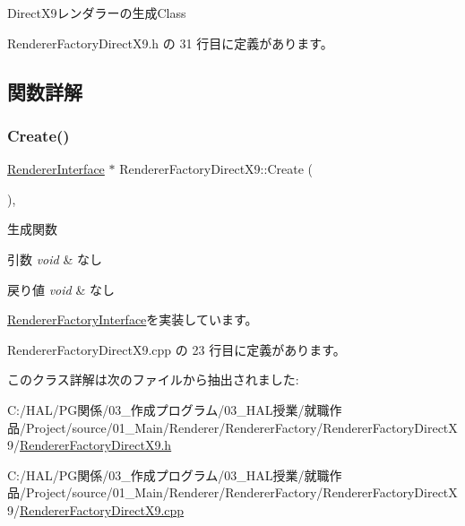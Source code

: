 Direct\+X9レンダラーの生成\+Class 

 Renderer\+Factory\+Direct\+X9.\+h の 31 行目に定義があります。



\subsection{関数詳解}
\mbox{\label{class_renderer_factory_direct_x9_a55541ea707af7ba3c006b0ea11a1fd49}} 
\subsubsection{\texorpdfstring{Create()}{Create()}}
{\footnotesize\ttfamily \mbox{\hyperlink{class_renderer_interface}{Renderer\+Interface}} $\ast$ Renderer\+Factory\+Direct\+X9\+::\+Create (\begin{DoxyParamCaption}{ }\end{DoxyParamCaption})\hspace{0.3cm}{\ttfamily [override]}, {\ttfamily [virtual]}}



生成関数 


\begin{DoxyParams}{引数}
{\em void} & なし \\
\hline
\end{DoxyParams}

\begin{DoxyRetVals}{戻り値}
{\em void} & なし \\
\hline
\end{DoxyRetVals}


\mbox{\hyperlink{class_renderer_factory_interface_aa81911973b6079fda8489409385d71e3}{Renderer\+Factory\+Interface}}を実装しています。



 Renderer\+Factory\+Direct\+X9.\+cpp の 23 行目に定義があります。



このクラス詳解は次のファイルから抽出されました\+:\begin{DoxyCompactItemize}
\item 
C\+:/\+H\+A\+L/\+P\+G関係/03\+\_\+作成プログラム/03\+\_\+\+H\+A\+L授業/就職作品/\+Project/source/01\+\_\+\+Main/\+Renderer/\+Renderer\+Factory/\+Renderer\+Factory\+Direct\+X9/\mbox{\hyperlink{_renderer_factory_direct_x9_8h}{Renderer\+Factory\+Direct\+X9.\+h}}\item 
C\+:/\+H\+A\+L/\+P\+G関係/03\+\_\+作成プログラム/03\+\_\+\+H\+A\+L授業/就職作品/\+Project/source/01\+\_\+\+Main/\+Renderer/\+Renderer\+Factory/\+Renderer\+Factory\+Direct\+X9/\mbox{\hyperlink{_renderer_factory_direct_x9_8cpp}{Renderer\+Factory\+Direct\+X9.\+cpp}}\end{DoxyCompactItemize}
